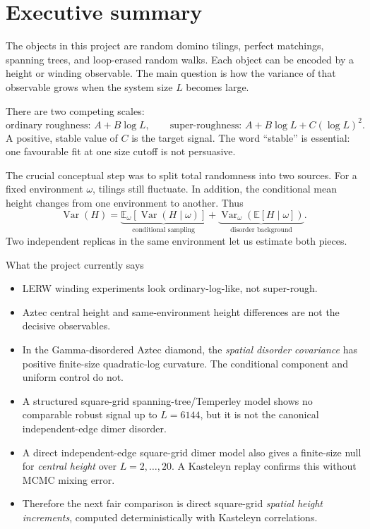 \documentclass[11pt,a4paper,oneside,openany]{memoir}
\newcommand{\E}{\mathbb{E}}
\newcommand{\Var}{\operatorname{Var}}
\newcommand{\1}{\bm{1}}
\begin{document}
\mainmatter

\chapter{Executive summary}
\label{chap:summary}

The objects in this project are random domino tilings, perfect matchings,
spanning trees, and loop-erased random walks. Each object can be encoded by a
height or winding observable. The main question is how the variance of that
observable grows when the system size $L$ becomes large.

There are two competing scales:
\[
  \text{ordinary roughness: } A+B\log L,
  \qquad
  \text{super-roughness: } A+B\log L+C(\log L)^2.
\]
A positive, stable value of $C$ is the target signal. The word ``stable'' is
essential: one favourable fit at one size cutoff is not persuasive.

The crucial conceptual step was to split total randomness into two sources.
For a fixed environment $\omega$, tilings still fluctuate. In addition, the
conditional mean height changes from one environment to another. Thus
\[
\Var(H)
=\underbrace{\E_\omega[\Var(H\mid\omega)]}_{\text{conditional sampling}}
+\underbrace{\Var_\omega(\E[H\mid\omega])}_{\text{disorder background}}.
\]
Two independent replicas in the same environment let us estimate both pieces.

\begin{resultbox}{What the project currently says}
\begin{itemize}
  \item LERW winding experiments look ordinary-log-like, not super-rough.
  \item Aztec central height and same-environment height differences are not the decisive observables.
  \item In the Gamma-disordered Aztec diamond, the \emph{spatial disorder covariance} has positive finite-size quadratic-log curvature. The conditional component and uniform control do not.
  \item A structured square-grid spanning-tree/Temperley model shows no comparable robust signal up to $L=6144$, but it is not the canonical independent-edge dimer disorder.
  \item A direct independent-edge square-grid dimer model also gives a finite-size null for \emph{central height} over $L=2,\ldots,20$. A Kasteleyn replay confirms this without MCMC mixing error.
  \item Therefore the next fair comparison is direct square-grid \emph{spatial height increments}, computed deterministically with Kasteleyn correlations.
\end{itemize}
\end{resultbox}
\end{document}
